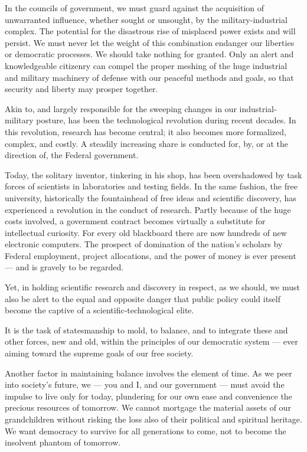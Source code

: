 \documentclass[a4paper]{amsbook}
\begin{document}
In the councils of government, we must guard against the acquisition of unwarranted influence, whether sought or unsought, by the military-industrial complex. The potential for the disastrous rise of misplaced power exists and will persist. We must never let the weight of this combination endanger our liberties or democratic processes. We should take nothing for granted. Only an alert and knowledgeable citizenry can compel the proper meshing of the huge industrial and military machinery of defense with our peaceful methods and goals, so that security and liberty may prosper together.

Akin to, and largely responsible for the sweeping changes in our industrial-military posture, has been the technological revolution during recent decades. In this revolution, research has become central; it also becomes more formalized, complex, and costly. A steadily increasing share is conducted for, by, or at the direction of, the Federal government.

Today, the solitary inventor, tinkering in his shop, has been overshadowed by task forces of scientists in laboratories and testing fields. In the same fashion, the free university, historically the fountainhead of free ideas and scientific discovery, has experienced a revolution in the conduct of research. Partly because of the huge costs involved, a government contract becomes virtually a substitute for intellectual curiosity. For every old blackboard there are now hundreds of new electronic computers. The prospect of domination of the nation's scholars by Federal employment, project allocations, and the power of money is ever present — and is gravely to be regarded.

Yet, in holding scientific research and discovery in respect, as we should, we must also be alert to the equal and opposite danger that public policy could itself become the captive of a scientific-technological elite.

It is the task of statesmanship to mold, to balance, and to integrate these and other forces, new and old, within the principles of our democratic system — ever aiming toward the supreme goals of our free society.

Another factor in maintaining balance involves the element of time. As we peer into society's future, we — you and I, and our government — must avoid the impulse to live only for today, plundering for our own ease and convenience the precious resources of tomorrow. We cannot mortgage the material assets of our grandchildren without risking the loss also of their political and spiritual heritage. We want democracy to survive for all generations to come, not to become the insolvent phantom of tomorrow.
\end{document}
